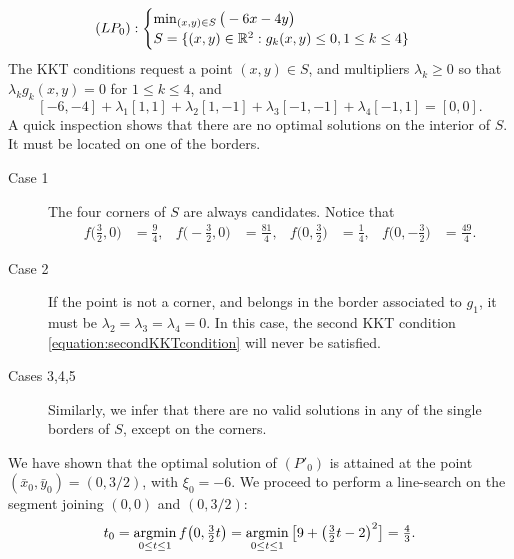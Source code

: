 \begin{example}
\begin{equation*}
(LP_0): \begin{cases} \min_{(x,y) \in S} \big( -6x-4y \big) \\ S = \{ (x,y) \in \mathbb{R}^2 : g_k(x,y) \leq 0, 1 \leq k \leq 4 \} \end{cases}
\end{equation*}
The KKT conditions request a point $(x,y) \in S$, and multipliers $\lambda_k \geq 0$ so that $\lambda_k g_k(x,y) = 0$ for $1\leq k \leq 4$, and
\begin{equation}\label{equation:secondKKTcondition}
[-6,-4] + \lambda_1 [1,1] + \lambda_2 [1,-1] + \lambda_3 [-1,-1] + \lambda_4 [-1,1] = [0,0].
\end{equation}
A quick inspection shows that there are no optimal solutions on the interior of $S$.  It must be located on one of the borders. 
\begin{description}
\item[Case 1] The four corners of $S$ are always candidates.  Notice that
\begin{align*}
f\big(\tfrac{3}{2}, 0\big) &= \tfrac{9}{4}, & f\big(-\tfrac{3}{2}, 0\big) &= \tfrac{81}{4}, &
f\big(0, \tfrac{3}{2}\big) &= \tfrac{1}{4}, & f\big(0, -\tfrac{3}{2}\big) &= \tfrac{49}{4}. 
\end{align*}
\item[Case 2] If the point is not a corner, and belongs in the border associated to $g_1$, it must be $\lambda_2=\lambda_3=\lambda_4=0$.  In this case, the second KKT condition \eqref{equation:secondKKTcondition} will never be satisfied. 
\item[Cases 3,4,5] Similarly, we infer that there are no valid solutions in any of the single borders of $S$, except on the corners.
\end{description}
We have shown that the optimal solution of $(P'_0)$ is attained at the point $(\bar{x}_0, \bar{y}_0) = (0, 3/2)$, with $\xi_0 = -6$. We proceed to perform a line-search on the segment joining $(0,0)$ and $(0,3/2)$:
\begin{equation*}
t_0 = \operatorname*{argmin}_{0 \leq t \leq 1} f\big(0, \tfrac{3}{2}t \big) = \operatorname*{argmin}_{0 \leq t \leq 1} \big[ 9 + \big(\tfrac{3}{2}t-2 \big)^2 \big] = \tfrac{4}{3}.
\end{equation*}



\end{example}